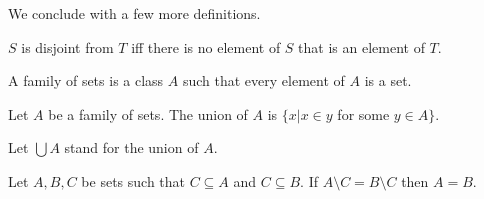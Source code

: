 \documentclass{article}
\begin{document}
%
We conclude with a few more definitions.
%
\begin{forthel}
  \begin{definition}
    $S$ is disjoint from $T$ iff there is no element of $S$ that is an element
    of $T$.
  \end{definition}

  \begin{definition}
    A family of sets is a class $A$ such that every element of 
$A$ is a set.
  \end{definition}

\begin{definition}
Let $A$ be a family of sets. The union of $A$
is $ \{x | x \in y$ for some $y \in A\}$.
\end{definition}

Let $\bigcup A$ stand for the union of $A$.


\begin{lemma}
Let $A,B,C$ be sets such that $C \subseteq A$ and $C \subseteq B$.
If $A \setminus C = B \setminus C$ then $A = B$.
\end{lemma}


\end{forthel}
%
\end{document}
